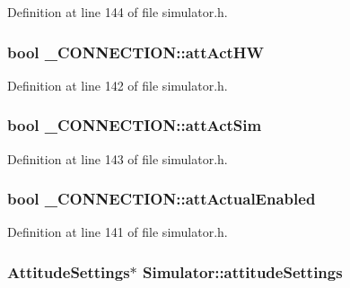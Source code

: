 Definition at line 144 of file simulator.\-h.

\hypertarget{group___h_i_t_l_plugin_ga4e0f8f54388f25df1142b8f895a4b445}{
\subsubsection[{att\-Act\-H\-W}]{\setlength{\rightskip}{0pt plus 5cm}bool \-\_\-\-C\-O\-N\-N\-E\-C\-T\-I\-O\-N\-::att\-Act\-H\-W}}\label{group___h_i_t_l_plugin_ga4e0f8f54388f25df1142b8f895a4b445}


Definition at line 142 of file simulator.\-h.

\hypertarget{group___h_i_t_l_plugin_ga8620f5c9256ac5988861939a70fde264}{
\subsubsection[{att\-Act\-Sim}]{\setlength{\rightskip}{0pt plus 5cm}bool \-\_\-\-C\-O\-N\-N\-E\-C\-T\-I\-O\-N\-::att\-Act\-Sim}}\label{group___h_i_t_l_plugin_ga8620f5c9256ac5988861939a70fde264}


Definition at line 143 of file simulator.\-h.

\hypertarget{group___h_i_t_l_plugin_ga9b02793b3d0effcdb43df1d5e20012fd}{
\subsubsection[{att\-Actual\-Enabled}]{\setlength{\rightskip}{0pt plus 5cm}bool \-\_\-\-C\-O\-N\-N\-E\-C\-T\-I\-O\-N\-::att\-Actual\-Enabled}}\label{group___h_i_t_l_plugin_ga9b02793b3d0effcdb43df1d5e20012fd}


Definition at line 141 of file simulator.\-h.

\hypertarget{group___h_i_t_l_plugin_ga4430b724d2151ce662d6b82a3b8ba74a}{
\subsubsection[{attitude\-Settings}]{\setlength{\rightskip}{0pt plus 5cm}Attitude\-Settings$\ast$ Simulator\-::attitude\-Settings\hspace{0.3cm}{\ttfamily [protected]}}}\label{group___h_i_t_l_plugin_ga4430b724d2151ce662d6b82a3b8ba74a}


